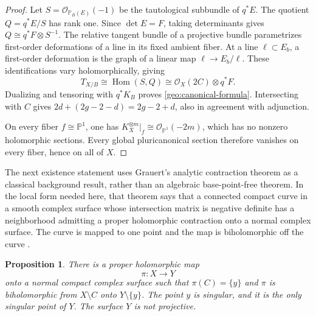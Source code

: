\documentclass[11pt,a4paper]{article}
\numberwithin{equation}{section}
\newtheorem{proposition}[theorem]{Proposition}
\theoremstyle{definition}
\theoremstyle{remark}
\renewcommand{\P}{\mathbb P}
\newcommand{\OO}{\mathcal O}
\DeclareMathOperator{\Hom}{Hom}
\begin{document}
\begin{proof}
Let $S=\OO_{\P_B(E)}(-1)$ be the tautological subbundle of $q^*E$.
The quotient $Q=q^*E/S$ has rank one.  Since $\det E=F$, taking
determinants gives $Q\cong q^*F\otimes S^{-1}$.  The relative
 tangent bundle of a projective bundle parametrizes first-order
deformations of a line in its fixed ambient fiber.
At a line $\ell\subset E_b$, a first-order deformation is the graph
of a linear map $\ell\to E_b/\ell$. These identifications vary
holomorphically, giving
\[
  T_{X/B}\cong\Hom(S,Q)
            \cong\OO_X(2C)\otimes q^*F.
\]
Dualizing and tensoring with $q^*K_B$ proves
\eqref{geo:canonical-formula}.  Intersecting with $C$ gives
$2d+(2g-2-d)=2g-2+d$, also in agreement with adjunction.

On every fiber $f\cong\P^1$, one has
$K_X^{\otimes m}|_f\cong\OO_{\P^1}(-2m)$, which has no nonzero
holomorphic sections.  Every global pluricanonical section
therefore vanishes on every fiber, hence on all of $X$.
\end{proof}

The next existence statement uses Grauert's analytic contraction
theorem as a classical background result, rather than an algebraic
base-point-free theorem.  In the local form needed here, that
theorem says that a connected compact curve in a smooth complex
surface whose intersection matrix is negative definite has a
neighborhood admitting a proper holomorphic contraction onto a
normal complex surface.  The curve is mapped to one point and the
map is biholomorphic off the curve
\cite{Grauert1962,BHPV2004}.

\begin{proposition}\label{geo:contraction}
There is a proper holomorphic map
\[
  \pi:X\longrightarrow Y
\]
onto a normal compact complex surface such that
$\pi(C)=\{y\}$ and $\pi$ is biholomorphic from $X\setminus C$
onto $Y\setminus\{y\}$.  The point $y$ is singular, and it is the
only singular point of $Y$.  The surface $Y$ is not projective.
\end{proposition}
\end{document}
